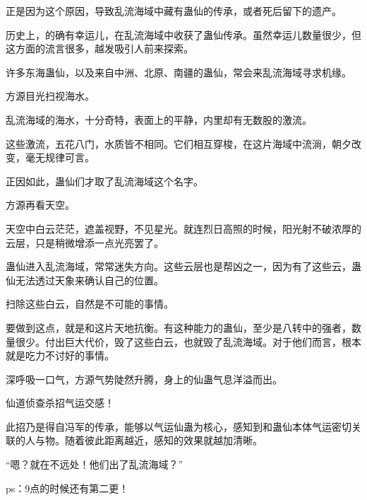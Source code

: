 \begin{this_body}
正是因为这个原因，导致乱流海域中藏有蛊仙的传承，或者死后留下的遗产。

历史上，的确有幸运儿，在乱流海域中收获了蛊仙传承。虽然幸运儿数量很少，但这方面的流言很多，越发吸引人前来探索。

许多东海蛊仙，以及来自中洲、北原、南疆的蛊仙，常会来乱流海域寻求机缘。

方源目光扫视海水。

乱流海域的海水，十分奇特，表面上的平静，内里却有无数股的激流。

这些激流，五花八门，水质皆不相同。它们相互穿梭，在这片海域中流淌，朝夕改变，毫无规律可言。

正因如此，蛊仙们才取了乱流海域这个名字。

方源再看天空。

天空中白云茫茫，遮盖视野，不见星光。就连烈日高照的时候，阳光射不破浓厚的云层，只是稍微增添一点光亮罢了。

蛊仙进入乱流海域，常常迷失方向。这些云层也是帮凶之一，因为有了这些云，蛊仙无法透过天象来确认自己的位置。

扫除这些白云，自然是不可能的事情。

要做到这点，就是和这片天地抗衡。有这种能力的蛊仙，至少是八转中的强者，数量很少。付出巨大代价，毁了这些白云，也就毁了乱流海域。对于他们而言，根本就是吃力不讨好的事情。

深呼吸一口气，方源气势陡然升腾，身上的仙蛊气息洋溢而出。

仙道侦查杀招气运交感！

此招乃是得自冯军的传承，能够以气运仙蛊为核心，感知到和蛊仙本体气运密切关联的人与物。随着彼此距离越近，感知的效果就越加清晰。

“嗯？就在不远处！他们出了乱流海域？”

ps：9点的时候还有第二更！

\end{this_body}

